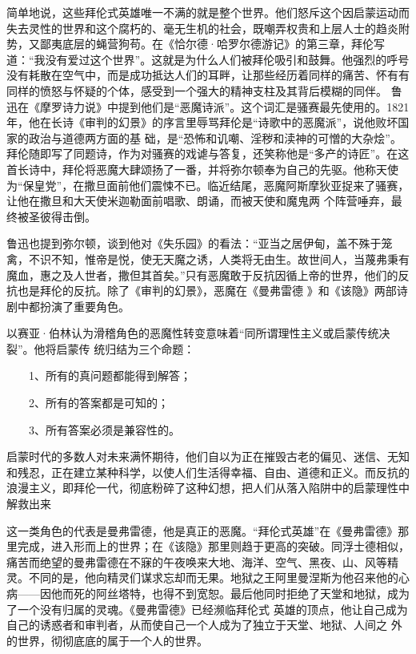 \documentclass{article}
\begin{document}
简单地说，这些拜伦式英雄唯一不满的就是整个世界。他们怒斥这个因启蒙运动而失去灵性的世界和这个腐朽的、毫无生机的社会，既嘲弄权贵和上层人士的趋炎附势，又鄙夷底层的蝇营狗苟。在《恰尔德·哈罗尔德游记》的第三章，拜伦写道：“我没有爱过这个世界”。这就是为什么人们被拜伦吸引和鼓舞。他强烈的呼号没有耗散在空气中，而是成功抵达人们的耳畔，让那些经历着同样的痛苦、怀有有同样的愤怒与怀疑的个体，感受到一个强大的精神支柱及其背后模糊的同伴。
鲁迅在《摩罗诗力说》中提到他们是“恶魔诗派”。这个词汇是骚赛最先使用的。1821年，他在长诗《审判的幻景》的序言里辱骂拜伦是“诗歌中的恶魔派”，说他败坏国家的政治与道德两方面的基
\newpage
础，是“恐怖和讥嘲、淫秽和渎神的可憎的大杂烩”。拜伦随即写了同题诗，作为对骚赛的戏谑与答复，还笑称他是“多产的诗匠”。在这首长诗中，拜伦将恶魔大肆颂扬了一番，并将弥尔顿奉为自己的先驱。他称天使为“保皇党”，在撒旦面前他们震悚不已。临近结尾，恶魔阿斯摩狄亚捉来了骚赛，让他在撒旦和大天使米迦勒面前唱歌、朗诵，而被天使和魔鬼两
个阵营唾弃，最终被圣彼得击倒。 

鲁迅也提到弥尔顿，谈到他对《失乐园》的看法：“亚当之居伊甸，盖不殊于笼禽，不识不知，惟帝是悦，使无天魔之诱，人类将无由生。故世间人，当蔑弗秉有魔血，惠之及人世者，撒但其首矣。”只有恶魔敢于反抗因循上帝的世界，他们的反抗也是拜伦的反抗。除了《审判的幻景》，恶魔在《曼弗雷德
》和《该隐》两部诗剧中都扮演了重要角色。 

以赛亚·伯林认为滑稽角色的恶魔性转变意味着“同所谓理性主义或启蒙传统决裂”。他将启蒙传
统归结为三个命题： 

\newpage


　　1、所有的真问题都能得到解答； 


　　2、所有的答案都是可知的； 


　　3、所有答案必须是兼容性的。 

启蒙时代的多数人对未来满怀期待，他们自以为正在摧毁古老的偏见、迷信、无知和残忍，正在建立某种科学，以使人们生活得幸福、自由、道德和正义。而反抗的浪漫主义，即拜伦一代，彻底粉碎了这种幻想，把人们从落入陷阱中的启蒙理性中解救出来

这一类角色的代表是曼弗雷德，他是真正的恶魔。“拜伦式英雄”在《曼弗雷德》那里完成，进入形而上的世界；在《该隐》那里则趋于更高的突破。同浮士德相似，痛苦而绝望的曼弗雷德在不寐的午夜唤来大地、海洋、空气、黑夜、山、风等精灵。不同的是，他向精灵们谋求忘却而无果。地狱之王阿里曼涅斯为他召来他的心病——因他而死的阿丝塔特，也得不到宽恕。最后他同时拒绝了天堂和地狱，成为了一个没有归属的灵魂。《曼弗雷德》已经濒临拜伦式
\newpage
英雄的顶点，他让自己成为自己的诱惑者和审判者，从而使自己一个人成为了独立于天堂、地狱、人间之
外的世界，彻彻底底的属于一个人的世界。 
\end{document}
